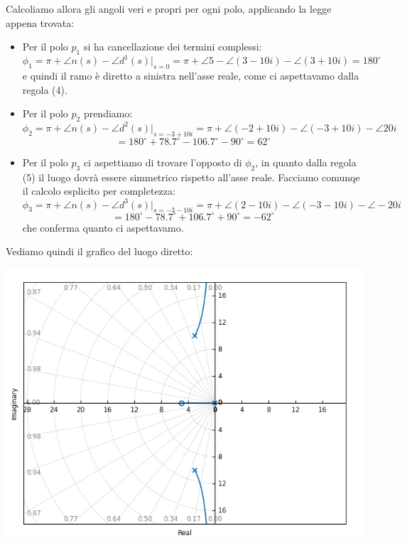 \documentclass[a4paper,11pt]{article}
\begin{document}
\begin{enumerate}
		Calcoliamo allora gli angoli veri e propri per ogni polo, applicando la legge appena trovata:
		\begin{itemize}
			\item Per il polo $p_1$ si ha cancellazione dei termini complessi:
		$$
		\phi_1 = \pi + \angle n(s) - \angle d^1(s) \Big|_{s = 0} = \pi + \angle 5 - \angle(3 - 10i) - \angle (3 + 10 i) =180^\circ
		$$
		e quindi il ramo è diretto a sinistra nell'asse reale, come ci aspettavamo dalla regola (4). 
	\item Per il polo $p_2$ prendiamo: 
		$$
		\phi_2 = \pi + \angle n(s) - \angle d^2(s) \Big|_{s = -3 + 10i} = \pi + \angle (-2 + 10i) - \angle (-3 + 10i) - \angle 20 i
		$$
		$$
		= 180^\circ + 78.7^\circ - 106.7^\circ - 90^\circ = 62^\circ
		$$
	\item Per il polo $p_3$ ci aspettiamo di trovare l'opposto di $\phi_2$, in quanto dalla regola (5) il luogo dovrà essere simmetrico rispetto all'asse reale.
		Facciamo comunqe il calcolo esplicito per completezza:
		$$
		\phi_3 = \pi + \angle n(s) - \angle d^3(s) \Big|_{s = -3 - 10i} = \pi + \angle (2 - 10i) - \angle (-3 - 10i) - \angle -20 i
		$$
		$$
		= 180^\circ - 78.7^\circ + 106.7^\circ + 90^\circ = -62^\circ
		$$
		che conferma quanto ci aspettavamo.
		\end{itemize}

		Vediamo quindi il grafico del luogo diretto:
		\begin{center}
			\includegraphics[scale=0.8]{../figures/rlocus/15_151090.png}
		\end{center}
\end{enumerate}
\end{document}
